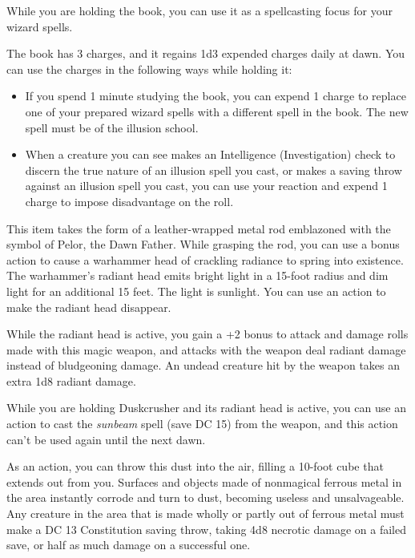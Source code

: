 \documentclass[10pt,a4paper,twoside,bg=print,twocolumn,openany,nodeprecatedcode]{dndbook}
\begin{document}
While you are holding the book, you can use it as a spellcasting focus for your wizard spells.

The book has 3 charges, and it regains 1d3 expended charges daily at dawn. You can use the charges in the following ways while holding it:


\begin{itemize}
\item If you spend 1 minute studying the book, you can expend 1 charge to replace one of your prepared wizard spells with a different spell in the book. The new spell must be of the illusion school.
\item When a creature you can see makes an Intelligence (Investigation) check to discern the true nature of an illusion spell you cast, or makes a saving throw against an illusion spell you cast, you can use your reaction and expend 1 charge to impose disadvantage on the roll.
\end{itemize}

This item takes the form of a leather-wrapped metal rod emblazoned with the symbol of Pelor, the Dawn Father. While grasping the rod, you can use a bonus action to cause a warhammer head of crackling radiance to spring into existence. The warhammer's radiant head emits bright light in a 15-foot radius and dim light for an additional 15 feet. The light is sunlight. You can use an action to make the radiant head disappear.

While the radiant head is active, you gain a +2 bonus to attack and damage rolls made with this magic weapon, and attacks with the weapon deal radiant damage instead of bludgeoning damage. An undead creature hit by the weapon takes an extra 1d8 radiant damage.

While you are holding Duskcrusher and its radiant head is active, you can use an action to cast the \textit{sunbeam} spell (save DC 15) from the weapon, and this action can't be used again until the next dawn.

As an action, you can throw this dust into the air, filling a 10-foot cube that extends out from you. Surfaces and objects made of nonmagical ferrous metal in the area instantly corrode and turn to dust, becoming useless and unsalvageable. Any creature in the area that is made wholly or partly out of ferrous metal must make a DC 13 Constitution saving throw, taking 4d8 necrotic damage on a failed save, or half as much damage on a successful one.
\end{document}
